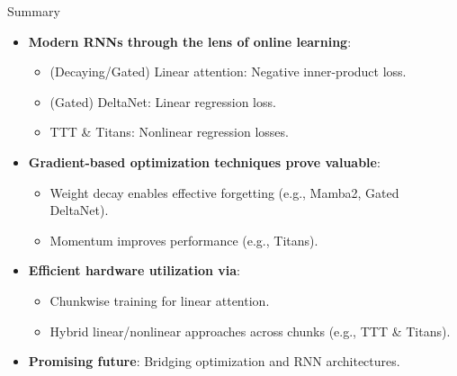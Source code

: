   \begin{frame}{Summary}
    \begin{itemize}
        \item \textbf{Modern RNNs through the lens of online learning}:
            \begin{itemize}
                \item (Decaying/Gated) Linear attention: Negative inner-product loss.
                \item (Gated) DeltaNet: Linear regression loss.
                \item TTT \& Titans: Nonlinear regression losses.
            \end{itemize}
        
        \item \textbf{Gradient-based optimization techniques prove valuable}:
            \begin{itemize}
                \item Weight decay enables effective forgetting (e.g., Mamba2, Gated DeltaNet).
                \item Momentum improves performance (e.g., Titans).
            \end{itemize}
        
        \item \textbf{Efficient hardware utilization via}:
            \begin{itemize}
                \item Chunkwise training for linear attention.
                \item Hybrid linear/nonlinear approaches across chunks (e.g., TTT \& Titans).
            \end{itemize}
        
        \item \textbf{Promising future}: Bridging optimization and RNN architectures.
    \end{itemize}
\end{frame}


    



    


